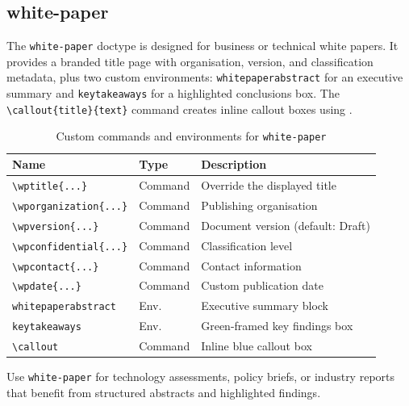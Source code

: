 \subsection{white-paper}

The \texttt{white-paper} doctype is designed for business or technical white
papers.  It provides a branded title page with organisation, version, and
classification metadata, plus two custom environments:
\texttt{whitepaperabstract} for an executive summary and
\texttt{keytakeaways} for a highlighted conclusions box.
The \texttt{\textbackslash callout\{title\}\{text\}} command creates
inline callout boxes using .

\begin{table}[htbp]
    \centering
    \caption{Custom commands and environments for \texttt{white-paper}}
    \label{tab:whitepaper-commands}
    \begin{tabular}{@{} l l p{5.5cm} @{}}
        \toprule
        \textbf{Name} & \textbf{Type} & \textbf{Description} \\
        \midrule
        \texttt{\textbackslash wptitle\{...\}}         & Command  & Override the displayed title \\
        \texttt{\textbackslash wporganization\{...\}}   & Command  & Publishing organisation \\
        \texttt{\textbackslash wpversion\{...\}}        & Command  & Document version (default: Draft) \\
        \texttt{\textbackslash wpconfidential\{...\}}   & Command  & Classification level \\
        \texttt{\textbackslash wpcontact\{...\}}        & Command  & Contact information \\
        \texttt{\textbackslash wpdate\{...\}}           & Command  & Custom publication date \\
        \texttt{whitepaperabstract}                     & Env.     & Executive summary block \\
        \texttt{keytakeaways}                           & Env.     & Green-framed key findings box \\
        \texttt{\textbackslash callout}                 & Command  & Inline blue callout box \\
        \bottomrule
    \end{tabular}
\end{table}

Use \texttt{white-paper} for technology assessments, policy briefs, or
industry reports that benefit from structured abstracts and highlighted
findings.

